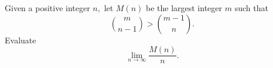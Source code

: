 Given a positive integer $n,$ let $M(n)$ be the largest integer $m$ such that
\[\binom{m}{n-1}>\binom{m-1}{n}.\]Evaluate
\[\lim_{n\to\infty}\frac{M(n)}{n}.\]